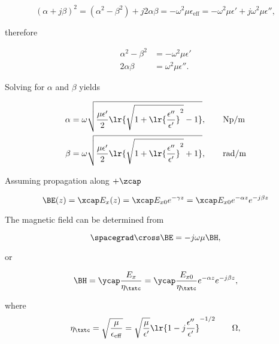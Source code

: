 \begin{dmath}\label{eqn:uwavesLecture3:120}
(\alpha + j \beta)^2
= (\alpha^2 - \beta^2) + j 2 \alpha \beta
= - \omega^2 \mu \epsilon_{\mathrm{eff}}
= - \omega^2 \mu \epsilon'
  + j \omega^2 \mu \epsilon'',
\end{dmath}

therefore

\begin{equation}\label{eqn:uwavesLecture3:140}
\begin{aligned}
\alpha^2 - \beta^2 &= - \omega^2 \mu \epsilon' \\
2 \alpha \beta &= \omega^2 \mu \epsilon''.
\end{aligned}
\end{equation}

Solving for \( \alpha \) and \( \beta \) yields

\begin{equation}\label{eqn:uwavesLecture3:160}
\begin{aligned}
\alpha &= \omega \sqrt{ \frac{\mu \epsilon'}{2} \lr{ \sqrt{ 1 + \lr{\frac{\epsilon''}{\epsilon'}}^2 } - 1 } }, \qquad \si{Np/m}  \\
\beta &= \omega \sqrt{ \frac{\mu \epsilon'}{2} \lr{ \sqrt{ 1 + \lr{\frac{\epsilon''}{\epsilon'}}^2 } + 1 } } , \qquad \si{rad/m} \\
\end{aligned}
\end{equation}

Assuming propagation along \( + \zcap \)

\begin{dmath}\label{eqn:uwavesLecture3:180}
\BE(z)
= \xcap E_x(z)
= \xcap E_{x0} e^{-\gamma z}
= \xcap E_{x0} e^{-\alpha z} e^{-j \beta z}
\end{dmath}

The magnetic field can be determined from

\begin{dmath}\label{eqn:uwavesLecture3:200}
\spacegrad \cross \BE = - j \omega \mu \BH,
\end{dmath}

or

\begin{dmath}\label{eqn:uwavesLecture3:220}
\BH
= \ycap \frac{E_x}{\eta_\txtc}
= \ycap \frac{E_{x0}}{\eta_\txtc} e^{-\alpha z} e^{-j \beta z},
\end{dmath}

where
\begin{dmath}\label{eqn:uwavesLecture3:240}
\eta_\txtc
= \sqrt{\frac{\mu}{\epsilon_{\mathrm{eff}}}}
= \sqrt{\frac{\mu}{\epsilon'}} \lr{ 1 - j \frac{\epsilon''}{\epsilon'} }^{-1/2} \qquad \Omega,
\end{dmath}

